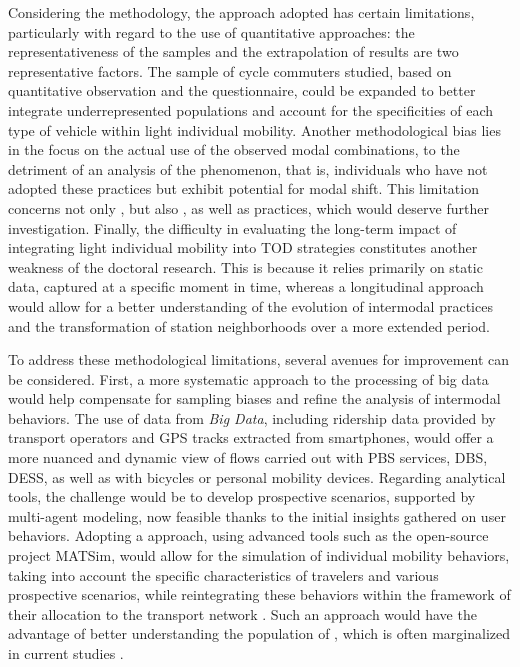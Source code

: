 \begin{refsegment}
Considering the methodology, the approach adopted has certain limitations, particularly with regard to the use of quantitative approaches: the representativeness of the samples and the extrapolation of results are two representative factors. The sample of cycle commuters studied, based on quantitative observation and the questionnaire, could be expanded to better integrate underrepresented populations and account for the specificities of each type of vehicle within light individual mobility. Another methodological bias lies in the focus on the actual use of the observed modal combinations, to the detriment of an analysis of the  phenomenon, that is, individuals who have not adopted these practices but exhibit potential for modal shift. This limitation concerns not only , but also , as well as  practices, which would deserve further investigation. Finally, the difficulty in evaluating the long-term impact of integrating light individual mobility into \acrshort{TOD} strategies \textcolor{blue}{\autocite{}} constitutes another weakness of the doctoral research. This is because it relies primarily on static data, captured at a specific moment in time, whereas a longitudinal approach would allow for a better understanding of the evolution of intermodal practices and the transformation of station neighborhoods over a more extended period.%

To address these methodological limitations, several avenues for improvement can be considered. First, a more systematic approach to the processing of big data would help compensate for sampling biases and refine the analysis of intermodal behaviors. The use of data from \textsl{Big Data}, including ridership data provided by transport operators and GPS tracks extracted from smartphones, would offer a more nuanced and dynamic view of flows carried out with \acrshort{PBS} services, \acrshort{DBS}, \acrshort{DESS}, as well as with bicycles or personal mobility devices. Regarding analytical tools, the challenge would be to develop prospective scenarios, supported by multi-agent modeling, now feasible thanks to the initial insights gathered on  user behaviors. Adopting a  approach, using advanced tools such as the open-source project \acrfull{MATSim}, would allow for the simulation of individual mobility behaviors, taking into account the specific characteristics of travelers and various prospective scenarios, while reintegrating these behaviors within the framework of their allocation to the transport network \textcolor{blue}{\autocite[119]{chapelon_transports_2016}}. Such an approach would have the advantage of better understanding the population of , which is often marginalized in current studies \textcolor{blue}{\autocite{poisson_amenagements_2019}}.%


\end{refsegment}
